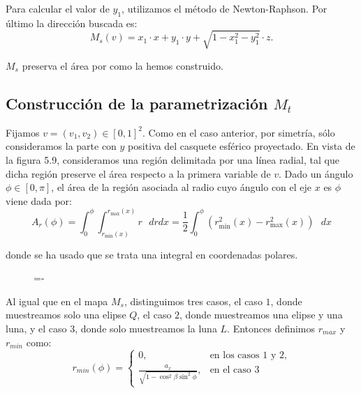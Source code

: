 Para calcular el valor de $y_1$, utilizamos el método de Newton-Raphson. Por último la dirección buscada es:
$$M_s(v) = x_1\cdot x + y_1\cdot y + \sqrt{1-x_1^2-y_1^2} \cdot z.$$

$M_s$ preserva el área por como la hemos construido.

\subsection{Construcción de la parametrización $M_t$}
Fijamos $v=(v_1,v_2)\in [0,1]^2$. Como en el caso anterior, por simetría, sólo consideramos la parte con $y$ positiva del casquete esférico proyectado. En vista de la figura 5.9, consideramos una región delimitada por una línea radial, tal que dicha región preserve el área respecto a la primera variable de $v$. Dado un ángulo $\phi\in [0,\pi]$, el área de la región asociada al radio cuyo ángulo con el eje $x$ es $\phi$ viene dada por:
$$A_r(\phi) = \int_0^{\phi}\int_{r_{\min}(x)}^{r_{\max}(x)} r \text{ }dr dx = \frac{1}{2}\int_0^{\phi}(r_{\min}^2(x)-r_{\max}^2(x))\text{ } dx$$

donde se ha usado que se trata una integral en coordenadas polares.

\begin{figure}[h]
  \lineskip=-\fboxrule
\end{figure}

 Al igual que en el mapa $M_s$, distinguimos tres casos, el caso $1$, donde muestreamos solo una elipse $Q$, el caso $2$, donde muestreamos una elipse y una luna, y el caso $3$, donde solo muestreamos la luna $L$. Entonces definimos $r_{max}$ y $r_{min}$ como:
\[ r_{min}(\phi) =
   \begin{cases}
      0, & \text{en los casos 1 y 2}, \\
      \frac{a_x}{\sqrt{1-\cos^2\beta\sin^2\phi}}, & \text{en el caso 3}
   \end{cases}
  \]

